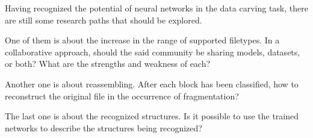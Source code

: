 Having recognized the potential of neural networks in the data carving task, there are still some research paths that should be explored.

One of them is about the increase in the range of supported filetypes. In a collaborative approach, should the said community be sharing models, datasets, or both? What are the strengths and weakness of each?

Another one is about reassembling. After each block has been classified, how to reconstruct the original file in the occurrence of fragmentation?

The last one is about the recognized structures. Is it possible to use the trained networks to describe the structures being recognized?



    
    



